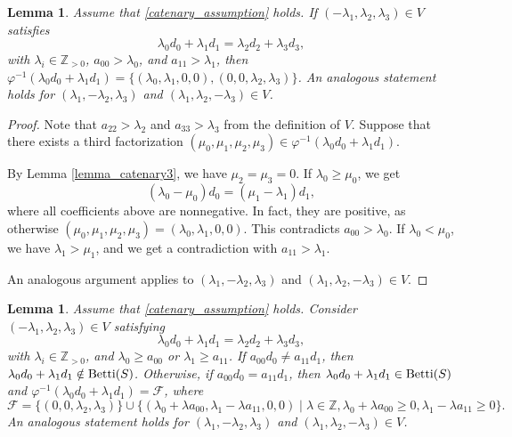 \documentclass[12pt]{article}
\newtheorem{lemma}[thm]{Lemma}
\theoremstyle{remark}
\begin{document}
\begin{lemma}\label{lemma_catenary1}
    Assume that \eqref{catenary_assumption} holds. If $(-\lambda_1,\lambda_2,\lambda_3) \in V$ satisfies
    $$ \lambda_0d_0 + \lambda_1d_1 = \lambda_2d_2 + \lambda_3d_3,$$
    with $\lambda_i \in \mathbb{Z}_{>0}$, $a_{00}>\lambda_0$, and $a_{11} > \lambda_1$, then $\varphi^{-1}(\lambda_0d_0 + \lambda_1d_1) = \{(\lambda_0,\lambda_1,0,0), (0,0,\lambda_2,\lambda_3) \} $. An analogous statement holds for $(\lambda_1,-\lambda_2,\lambda_3)$ and $(\lambda_1,\lambda_2,-\lambda_3) \in V$.
\end{lemma}
\begin{proof}
Note that $a_{22} > \lambda_2$ and $a_{33} > \lambda_3$ from the definition of $V$.
Suppose that there exists a third factorization $ (\mu_0,\mu_1,\mu_2,\mu_3) \in \varphi^{-1}(\lambda_0d_0 + \lambda_1d_1)$. 

By Lemma \ref{lemma_catenary3}, we have $\mu_2 = \mu_3 = 0 $. 
If $\lambda_0 \geq \mu_0$, we get
\begin{equation}\label{lemma_catenary1_eq1}
    (\lambda_0- \mu_0) d_0 =  (\mu_1 - \lambda_1)d_1,
\end{equation}
where all coefficients above are nonnegative. In fact, they are positive, as otherwise $(\mu_0,\mu_1,\mu_2,\mu_3) = (\lambda_0,\lambda_1,0,0)$. This contradicts $a_{00}>\lambda_0$. If $\lambda_0 < \mu_0$, we have $\lambda_1 > \mu_1$, and we get a contradiction with $a_{11}>\lambda_1$. 

An analogous argument applies to $(\lambda_1,-\lambda_2,\lambda_3)$ and $(\lambda_1,\lambda_2,-\lambda_3) \in V$.
\end{proof}


\begin{lemma}\label{lemma_catenarycase1}
    Assume that \eqref{catenary_assumption} holds. Consider $(-\lambda_1,\lambda_2,\lambda_3) \in V$ satisfying
    $$ \lambda_0d_0 + \lambda_1d_1 = \lambda_2d_2 + \lambda_3d_3,$$
    with $\lambda_i \in \mathbb{Z}_{>0}$, and $\lambda_0 \geq a_{00}$ or $\lambda_1 \geq a_{11}$. If $a_{00}d_0 \neq a_{11}d_1$, then $\lambda_0d_0 + \lambda_1d_1 \notin \textup{Betti}(S)$. Otherwise, if $a_{00}d_0 = a_{11}d_1$, then $\lambda_0d_0 + \lambda_1d_1 \in \textup{Betti}(S)$ and $\varphi^{-1}(\lambda_0d_0 + \lambda_1d_1) = \mathcal{F}$, where 
    $$\mathcal{F} =  \{(0,0,\lambda_2,\lambda_3)\}  \cup \{(\lambda_0 + \lambda a_{00},\lambda_1 - \lambda a_{11},0,0) \mid \lambda \in \mathbb{Z}, \lambda_0 + \lambda a_{00} \geq 0, \lambda_1 - \lambda a_{11} \geq 0 \} . $$   
    An analogous statement holds for $(\lambda_1,-\lambda_2,\lambda_3)$ and $(\lambda_1,\lambda_2,-\lambda_3) \in V$.
    
    
    
\end{lemma}
\end{document}
